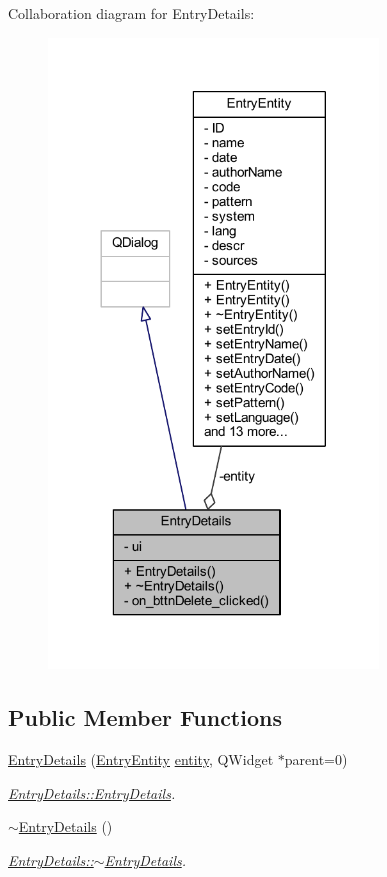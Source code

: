 Collaboration diagram for Entry\+Details\+:
\nopagebreak
\begin{figure}[H]
\begin{center}
\leavevmode
\includegraphics[width=248pt]{class_entry_details__coll__graph}
\end{center}
\end{figure}
\subsection*{Public Member Functions}
\begin{DoxyCompactItemize}
\item 
\hyperlink{class_entry_details_a636962c9912b8f6c25ed03ef10098423}{Entry\+Details} (\hyperlink{class_entry_entity}{Entry\+Entity} \hyperlink{class_entry_details_a8e6d1755f064f499cc5104aeb6985cb8}{entity}, Q\+Widget $\ast$parent=0)
\begin{DoxyCompactList}\small\item\em \hyperlink{class_entry_details_a636962c9912b8f6c25ed03ef10098423}{Entry\+Details\+::\+Entry\+Details}. \end{DoxyCompactList}\item 
\hyperlink{class_entry_details_ad500af502edaf2b661c7db036423699e}{$\sim$\+Entry\+Details} ()
\begin{DoxyCompactList}\small\item\em \hyperlink{class_entry_details_ad500af502edaf2b661c7db036423699e}{Entry\+Details\+::$\sim$\+Entry\+Details}. \end{DoxyCompactList}\end{DoxyCompactItemize}
